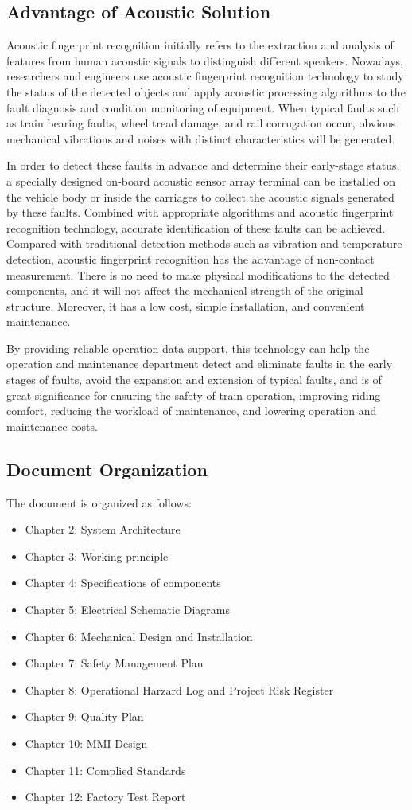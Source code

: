 \documentclass{article}
\begin{document}
\subsection{Advantage of Acoustic Solution}
Acoustic fingerprint recognition initially refers to the extraction and analysis of features from human acoustic signals to distinguish different speakers. Nowadays, researchers and engineers use acoustic fingerprint recognition technology to study the status of the detected objects and apply acoustic processing algorithms to the fault diagnosis and condition monitoring of equipment. When typical faults such as train bearing faults, wheel tread damage, and rail corrugation occur, obvious mechanical vibrations and noises with distinct characteristics will be generated. 

In order to detect these faults in advance and determine their early-stage status, a specially designed on-board acoustic sensor array terminal can be installed on the vehicle body or inside the carriages to collect the acoustic signals generated by these faults. Combined with appropriate algorithms and acoustic fingerprint recognition technology, accurate identification of these faults can be achieved. Compared with traditional detection methods such as vibration and temperature detection, acoustic fingerprint recognition has the advantage of non-contact measurement. There is no need to make physical modifications to the detected components, and it will not affect the mechanical strength of the original structure. Moreover, it has a low cost, simple installation, and convenient maintenance.

By providing reliable operation data support, this technology can help the operation and maintenance department detect and eliminate faults in the early stages of faults, avoid the expansion and extension of typical faults, and is of great significance for ensuring the safety of train operation, improving riding comfort, reducing the workload of maintenance, and lowering operation and maintenance costs.
\subsection{Document Organization}
The document is organized as follows:
\begin{itemize}
    \item Chapter 2: System Architecture
    \item Chapter 3: Working principle
    \item Chapter 4: Specifications of components
    \item Chapter 5: Electrical Schematic Diagrams
    \item Chapter 6: Mechanical Design and Installation
    \item Chapter 7: Safety Management Plan
    \item Chapter 8: Operational Harzard Log and Project Risk Register 
    \item Chapter 9: Quality Plan
    \item Chapter 10: MMI Design
    \item Chapter 11: Complied Standards
    \item Chapter 12: Factory Test Report
\end{itemize}
\end{document}
